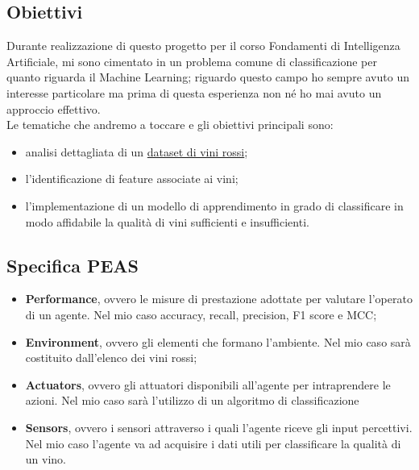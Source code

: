 \documentclass{article}
\begin{document}
\begin{titlepage}
        
        \subsection{Obiettivi}
            Durante realizzazione di questo progetto per il corso Fondamenti di Intelligenza Artificiale, mi sono cimentato in un problema comune di classificazione per quanto riguarda il Machine Learning; riguardo questo campo ho sempre avuto un interesse particolare ma prima di questa esperienza non né ho mai avuto un approccio effettivo. \\
            Le tematiche che andremo a toccare e gli obiettivi principali sono:
             \begin{itemize}
                \item analisi dettagliata di un \href{https://www.kaggle.com/datasets/uciml/red-wine-quality-cortez-et-al-2009}{dataset di vini rossi};
                \item l'identificazione di feature associate ai vini;
                \item l'implementazione di un modello di apprendimento in grado di classificare in modo affidabile la qualità di vini sufficienti e insufficienti.
            \end{itemize}
            
        \subsection{Specifica PEAS}
        \begin{itemize}
            \item \textbf{Performance}, ovvero le misure di prestazione adottate per valutare l’operato di un agente. Nel mio caso accuracy, recall, precision, F1 score e MCC;
            \item \textbf{Environment}, ovvero gli elementi che formano l’ambiente. Nel mio caso sarà costituito dall'elenco dei vini rossi;
            \item \textbf{Actuators}, ovvero gli attuatori disponibili all’agente per intraprendere le azioni. Nel mio caso sarà l'utilizzo di un algoritmo di classificazione
            \item \textbf{Sensors}, ovvero i sensori attraverso i quali l'agente riceve gli input percettivi. Nel mio caso l'agente va ad acquisire i dati utili per classificare la qualità di un vino.
        \end{itemize}

        \newpage

\end{titlepage}
\end{document}
